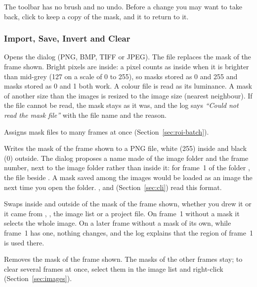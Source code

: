 \begin{notebox}
The toolbar has no brush and no undo. Before a change you may want to take back, click
 to keep a copy of the mask, and  it to return to it.
\end{notebox}

\subsubsection*{Import, Save, Invert and Clear}

\begin{description}[leftmargin=1.2cm,style=nextline]
  \item[Import]
    Opens the  dialog (PNG, BMP, TIFF or JPEG). The file replaces the mask
    of the frame shown. Bright pixels are inside: a pixel counts as inside when it is brighter
    than mid-grey (127 on a scale of 0 to 255), so masks stored as 0 and 255 and masks stored as
    0 and 1 both work. A colour file is read as its luminance. A mask of another size than the
    images is resized to the image size (nearest neighbour). If the file cannot be read, the
    mask stays as it was, and the log says \emph{``Could not read the mask file''} with the file
    name and the reason.
  \item[Batch Import]
    Assigns mask files to many frames at once (Section~\ref{sec:roi-batch}).
  \item[Save]
    Writes the mask of the frame shown to a PNG file, white (255) inside and black (0) outside.
    The dialog proposes a name made of the image folder and the frame number, next to the image
    folder rather than inside it: for frame~1 of the folder , the file
     beside . A mask saved among the images would be
    loaded as an image the next time you open the folder. , 
    and  (Section~\ref{sec:cli}) read this format.
  \item[Invert]
    Swaps inside and outside of the mask of the frame shown, whether you drew it or it came from
    , , the image list or a project file. On frame~1 without a mask it
    selects the whole image. On a later frame without a mask of its own, while frame~1 has one,
    nothing changes, and the log explains that the region of frame~1 is used there.
  \item[Clear]
    Removes the mask of the frame shown. The masks of the other frames stay; to clear several
    frames at once, select them in the image list and right-click (Section~\ref{sec:images}).
\end{description}

